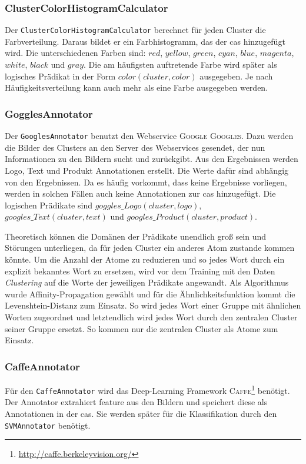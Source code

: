 \subsubsection{ClusterColorHistogramCalculator}
Der \texttt{ClusterColorHistogramCalculator} berechnet für jeden Cluster die Farbverteilung. Daraus bildet er ein Farbhistogramm, das der \gls{cas} hinzugefügt wird. Die unterschiedenen Farben sind: $red$, $yellow$, $green$, $cyan$, $blue$, $magenta$, $white$, $black$ und $gray$. Die am häufigsten auftretende Farbe wird später als logisches Prädikat in der Form $color(cluster,  color)$ ausgegeben. Je nach Häufigkeitsverteilung kann auch mehr als eine Farbe ausgegeben werden. 

\subsubsection{GogglesAnnotator}
Der \texttt{GooglesAnnotator} benutzt den Webservice \textsc{Google Googles}. Dazu werden die Bilder des Clusters an den Server des Webservices gesendet, der nun Informationen zu den Bildern sucht und zurückgibt. Aus den Ergebnissen werden Logo, Text und Produkt Annotationen erstellt. Die Werte dafür sind abhängig von den Ergebnissen. Da es häufig vorkommt, dass keine Ergebnisse vorliegen, werden in solchen Fällen auch keine Annotationen zur \gls{cas} hinzugefügt. Die logischen Prädikate sind $goggles\_Logo(cluster, logo)$, $googles\_Text(cluster, text)$ und $googles\_Product(cluster, product)$. \par

Theoretisch können die Domänen der Prädikate unendlich groß sein und Störungen unterliegen, da für jeden Cluster ein anderes Atom zustande kommen könnte. Um die Anzahl der Atome zu reduzieren und so jedes Wort durch ein explizit bekanntes Wort zu ersetzen, wird vor dem Training mit den Daten \textit{Clustering} auf die Worte der jeweiligen Prädikate angewandt. Als Algorithmus wurde Affinity-Propagation gewählt und für die Ähnlichkeitsfunktion kommt die Levenshtein-Distanz zum Einsatz. So wird jedes Wort einer Gruppe mit ähnlichen Worten zugeordnet und letztendlich wird jedes Wort durch den zentralen Cluster seiner Gruppe ersetzt. So kommen nur die zentralen Cluster als Atome zum Einsatz.


\subsubsection{CaffeAnnotator}
\label{sec:caffeAnno}
Für den \texttt{CaffeAnnotator} wird das Deep-Learning Framework \textsc{Caffe}\footnote{\url{http://caffe.berkeleyvision.org/}} benötigt. Der Annotator extrahiert \gls{feature} aus den Bildern und speichert diese als Annotationen in der \gls{cas}. Sie werden später für die Klassifikation durch den \texttt{SVMAnnotator} benötigt.  

